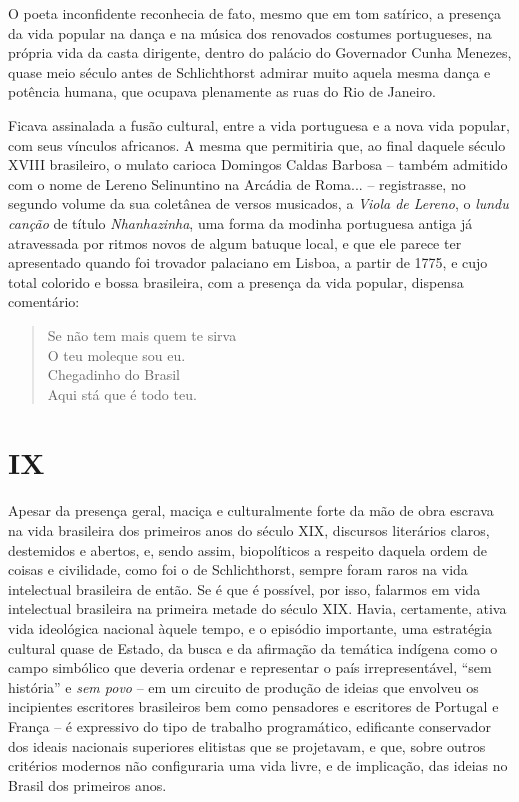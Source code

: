 O poeta inconfidente reconhecia de fato, mesmo que em tom satírico, a
presença da vida popular na dança e na música dos renovados costumes
portugueses, na própria vida da casta dirigente, dentro do palácio do
Governador Cunha Menezes, quase meio século antes de Schlichthorst
admirar muito aquela mesma dança e potência humana, que ocupava
plenamente as ruas do Rio de Janeiro.

Ficava assinalada a fusão cultural, entre a vida portuguesa e a nova
vida popular, com seus vínculos africanos. A mesma que permitiria que,
ao final daquele século XVIII brasileiro, o mulato carioca Domingos
Caldas Barbosa -- também admitido com o nome de Lereno Selinuntino na
Arcádia de Roma... -- registrasse, no segundo volume da sua coletânea de
versos musicados, a \emph{Viola de Lereno}, o \emph{lundu canção} de
título \emph{Nhanhazinha}, uma forma da modinha portuguesa antiga já
atravessada por ritmos novos de algum batuque local, e que ele parece
ter apresentado quando foi trovador palaciano em Lisboa, a partir de
1775, e cujo total colorido e bossa brasileira, com a presença da vida
popular, dispensa comentário:

\begin{verse}
Se não tem mais quem te sirva\\
O teu moleque sou eu.\\
Chegadinho do Brasil\\
Aqui stá que é todo teu.
\end{verse}

\section{IX}

Apesar da presença geral, maciça e culturalmente forte da mão de obra
escrava na vida brasileira dos primeiros anos do século XIX, discursos
literários claros, destemidos e abertos, e, sendo assim, biopolíticos a
respeito daquela ordem de coisas e civilidade, como foi o de
Schlichthorst, sempre foram raros na vida intelectual brasileira de
então. Se é que é possível, por isso, falarmos em vida intelectual
brasileira na primeira metade do século XIX. Havia, certamente, ativa
vida ideológica nacional àquele tempo, e o episódio importante, uma
estratégia cultural quase de Estado, da busca e da afirmação da temática
indígena como o campo simbólico que deveria ordenar e representar o país
irrepresentável, ``sem história'' e \emph{sem povo} -- em um circuito de
produção de ideias que envolveu os incipientes escritores brasileiros
bem como pensadores e escritores de Portugal e França -- é expressivo do
tipo de trabalho programático, edificante conservador dos ideais
nacionais superiores elitistas que se projetavam, e que, sobre outros
critérios modernos não configuraria uma vida livre, e de implicação, das
ideias no Brasil dos primeiros anos.

